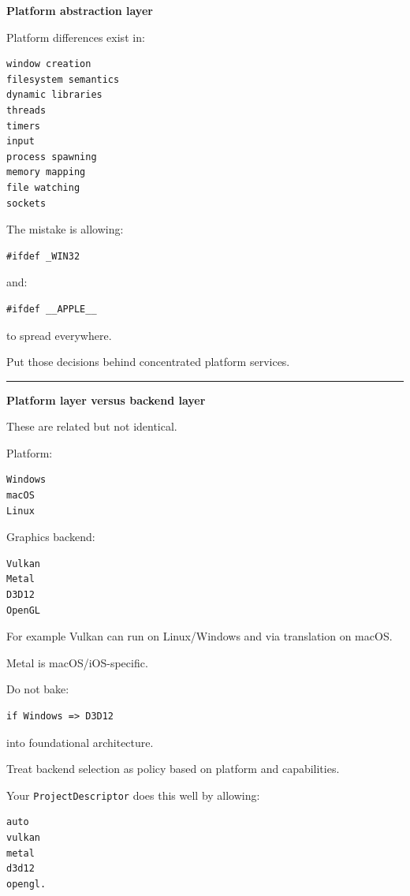\textbf{Platform abstraction layer}

Platform differences exist in:

\begin{verbatim}
window creation
filesystem semantics
dynamic libraries
threads
timers
input
process spawning
memory mapping
file watching
sockets
\end{verbatim}

The mistake is allowing:

\begin{verbatim}
#ifdef _WIN32
\end{verbatim}

and:

\begin{verbatim}
#ifdef __APPLE__
\end{verbatim}

to spread everywhere.

Put those decisions behind concentrated platform services.

\begin{center}\rule{0.5\linewidth}{0.5pt}\end{center}

\textbf{Platform layer versus backend layer}

These are related but not identical.

Platform:

\begin{verbatim}
Windows
macOS
Linux
\end{verbatim}

Graphics backend:

\begin{verbatim}
Vulkan
Metal
D3D12
OpenGL
\end{verbatim}

For example Vulkan can run on Linux/Windows and via translation on macOS.

Metal is macOS/iOS-specific.

Do not bake:

\begin{verbatim}
if Windows => D3D12
\end{verbatim}

into foundational architecture.

Treat backend selection as policy based on platform and capabilities.

Your \texttt{ProjectDescriptor} does this well by allowing:

\begin{verbatim}
auto
vulkan
metal
d3d12
opengl.
\end{verbatim}

